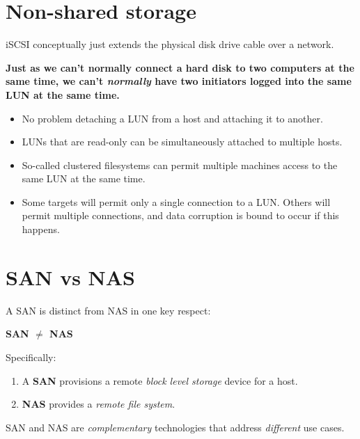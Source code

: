 \documentclass[slides]{pgnotes}
\begin{document}
\section{Non-shared storage}
\label{sec:non-shared-storage}

iSCSI conceptually just extends the physical disk drive cable over a
network.

\textbf{Just as we can't normally connect a hard disk to two computers
at the same time, we can't \emph{normally} have two initiators logged
into the same LUN at the same time.}

\begin{itemize}
\item
  No problem detaching a LUN from a host and attaching it to another.
\item
  LUNs that are read-only can be simultaneously attached to multiple hosts.
\item
  So-called clustered filesystems can permit multiple machines access to the same LUN at the same time.
\item Some targets will permit only a single connection to a LUN. Others will
permit multiple connections, and data corruption is bound to occur if
this happens.
\end{itemize}

\section{SAN vs NAS}
\label{sec:san-vs-nas}

A SAN is distinct from NAS in one key respect:

\begin{center}
\textbf{SAN \(\ne\) NAS}
\end{center}

Specifically:
\begin{enumerate}
\item A \textbf{SAN} provisions a remote \textit{block level storage} device for a host.
\item \textbf{NAS} provides a \textit{remote file system}.
\end{enumerate}
SAN and NAS are \emph{complementary} technologies that address \emph{different} use cases.
\end{document}
